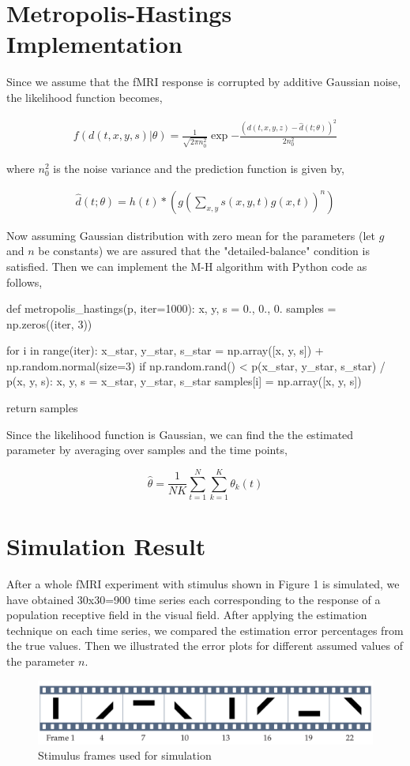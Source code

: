 \documentclass[review]{elsarticle}
\newcommand{\given}{|}
\newcommand{\pars}{\theta}
\begin{document}
\section{Metropolis-Hastings Implementation}
Since we assume that the fMRI response is corrupted by additive Gaussian noise, the likelihood function becomes,

\begin{eqnarray}
	f(d(t,x,y,s)\given\pars) = \frac{1}{\sqrt{2\pi n_0^2}}\exp{-\frac{(d(t,x,y,z) - \hat{d}(t;\pars))^2}{2 n_0^2}}
\end{eqnarray}

where $n_0^2$ is the noise variance and the prediction function is given by,

\begin{eqnarray}
\hat{d}(t;\pars) = h(t)* (g (\sum_{x, y} s(x, y, t) g(x, t))^n)
\end{eqnarray}

Now assuming Gaussian distribution with zero mean for the parameters (let $g$ and $n$ be constants) we are assured that the "detailed-balance" condition is satisfied. Then we can implement the M-H algorithm with Python code as follows,
\begin{python}
	def metropolis_hastings(p, iter=1000):
		x, y, s = 0., 0., 0.
		samples = np.zeros((iter, 3))
		
		for i in range(iter):
			x_star, y_star, s_star = np.array([x, y, s]) + np.random.normal(size=3)
			if np.random.rand() < p(x_star, y_star, s_star) / p(x, y, s):
				x, y, s = x_star, y_star, s_star
			samples[i] = np.array([x, y, s])
		
		return samples
\end{python}

Since the likelihood function is Gaussian, we can find the the estimated parameter by averaging over samples and the time points,

\begin{equation}
	\hat{\theta} = \frac{1}{NK}\sum_{t=1}^{N}\sum_{k=1}^{K} \pars_k(t)
\end{equation}
\section{Simulation Result}
After a whole fMRI experiment with stimulus shown in Figure 1 is simulated, we have obtained 30x30=900 time series each corresponding to the response of a population receptive field in the visual field. After applying the estimation technique on each time series, we compared the estimation error percentages from the true values. Then we illustrated the error plots for different assumed values of the parameter $n$.
\begin{figure}[htp]
	\centering
	\includegraphics[width=\textwidth]{stim.png}

	\caption{Stimulus frames used for simulation}
\end{figure}
\end{document}
